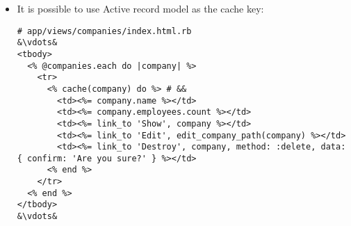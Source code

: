 \documentclass{beamer}
\begin{document}
\begin{frame}
\begin{itemize}
\item It is possible to use Active record model as the cache key:
\lstset{language=Ruby, style=eclipse}
\begin{lstlisting}[escapechar=&]
# app/views/companies/index.html.rb
&\vdots&
<tbody>
  <% @companies.each do |company| %>
    <tr>
      <% cache(company) do %> # &&
        <td><%= company.name %></td>
        <td><%= company.employees.count %></td>
        <td><%= link_to 'Show', company %></td>
        <td><%= link_to 'Edit', edit_company_path(company) %></td>
        <td><%= link_to 'Destroy', company, method: :delete, data: { confirm: 'Are you sure?' } %></td>
      <% end %>
    </tr>
  <% end %>
</tbody>
&\vdots&
\end{lstlisting}

\end{itemize}

\end{frame}
\end{document}
